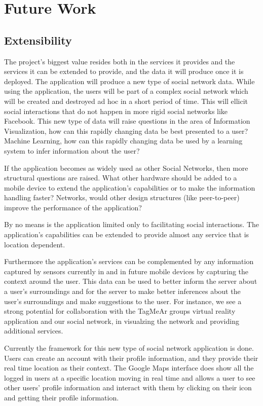 \documentclass[11pt]{article}
\begin{document}
\section{Future Work}
\subsection{Extensibility}

The project's biggest value resides both in the services it provides and the services it can be extended to provide, and the data it will produce once it is deployed. The application will produce a new type of social network data. While using the application, the users will be part of a complex social network which will be created and destroyed ad hoc in a short period of time. This will ellicit social interactions that do not happen in more rigid social networks like Facebook. This new type of data will raise questions in the area of Information Visualization, how can this rapidly changing data be best presented to a user? Machine Learning, how can this rapidly changing data be used by a learning system to infer information about the user? 

 If the application becomes as widely used as other Social Networks, then more structural questions are raised. What other hardware should be added to a mobile device to extend the application's capabilities or to make the information handling faster? Networks, would other design structures (like peer-to-peer) improve the performance of the application?

By no means is the application limited only to facilitating social interactions. The application's capabilities can be extended to provide almost any service that is location dependent. 


Furthermore the application's services can be complemented by any information captured by sensors currently in and in future mobile devices by capturing the context around the user. This data can be used to better inform the server about a user's surroundings and for the server to make better inferences about the user's surroundings and make suggestions to the user. For instance, we see a strong potential for collaboration with the TagMeAr groups virtual reality application and our social network, in visualzing the network and providing additional services.

Currently the framework for this new type of social network application is done. Users can create an account with their profile information, and they provide their real time location as their context. The Google Maps interface does show all the logged in users at a specific location moving in real time and allows a user to see other users' profile information and interact with them by clicking on their icon and getting their profile information.
\end{document}
